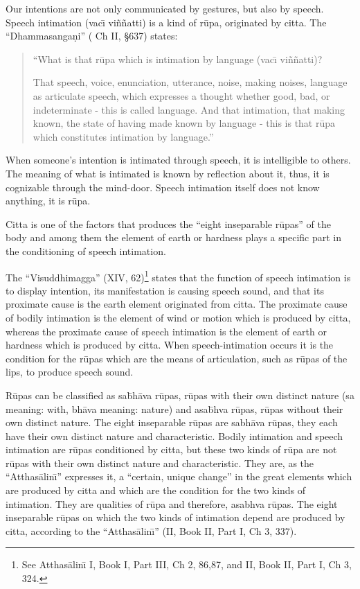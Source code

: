\documentclass{book}
\begin{document}
Our intentions are not only communicated by gestures, but also by
speech. Speech intimation (vac\=\i{} vi\~n\~natti) is a kind of r\=upa,
originated by citta. The ``Dhamma\-sanga\d ni'' ( Ch II, {\S}637) states:





\begin{quote}\begin{flushleft}
``What is that r\=upa which is intimation by language
(vac\=\i{} vi\~n\~natti)?

That speech, voice, enunciation, utterance, noise, making noises,
language as articulate speech, which expresses a thought whether good,
bad, or indeterminate - this is called language. And that intimation,
that making known, the state of having made known by language - this
is that r\=upa which constitutes intimation by language.''

\end{flushleft}\end{quote}



When someone's intention is intimated through speech, it is intelligible
to others. The meaning of what is intimated is known by reflection
about it, thus, it is cognizable through the mind-door. Speech
intimation itself does not know anything, it is r\=upa. 

Citta is one of the factors that produces the ``eight inseparable
r\=upas'' of the body and among them the element of earth or hardness
plays a specific part in the conditioning of speech intimation. 

The ``Visuddhimagga'' (XIV, 62)\footnote{See Atthas{\=a}lin\=\i{}  I,
Book I, Part III, Ch 2, 86,87, and II, Book II, Part I, Ch 3, 324.}
states that the function of speech intimation is to display intention,
its manifestation is causing speech sound, and that its proximate
cause is the earth element originated from citta. 
The proximate cause of bodily intimation is the element of wind or
motion which is produced by citta, whereas the proximate cause of
speech intimation is the element of earth or hardness which is produced
by citta. When speech-intimation occurs it is the condition for the
r\=upas which are the means of articulation, such as r\=upas of the
lips, to produce speech sound. 

R\=upas can be classified as sa\=bh{\=a}va r\=upas, r\=upas with their own
distinct nature (sa meaning: with, bh{\=a}va meaning: nature) and
asa\=bhva r\=upas, r\=upas without their own distinct nature. The
eight inseparable r\=upas are sabh{\=a}va r\=upas, they each have their
own distinct nature and characteristic. Bodily intimation and speech
intimation are r\=upas conditioned by citta, but these two kinds of
r\=upa are not r\=upas with their own distinct nature and
characteristic. They are, as the ``Atthas{\=a}lin\=\i'' expresses it, a
``certain, unique change'' in the great elements which are produced by
citta and which are the condition for the two kinds of intimation. They
are qualities of r\=upa and therefore, asabhva r\=upas. The eight
inseparable r\=upas on which the two kinds of intimation depend are
produced by citta, according to the ``Atthas{\=a}lin\=\i'' (II, Book II,
Part I, Ch 3, 337).
\end{document}
